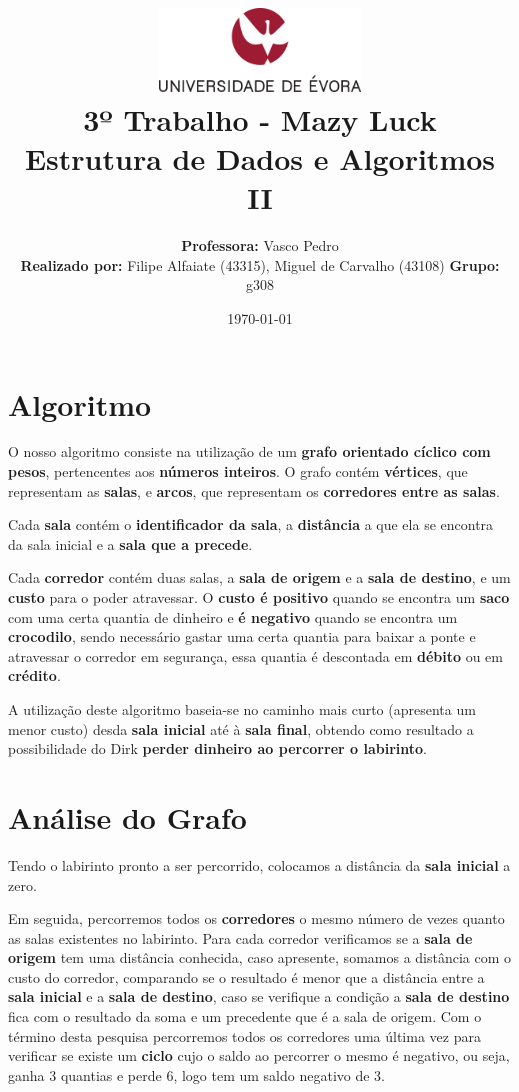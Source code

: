 \documentclass[11pt]{article}
\title
{
    \includegraphics[width=0.4\textwidth]{imgs/university.png}
    \\[0.1cm]
    \textbf{3º Trabalho - Mazy Luck} \\
    Estrutura de Dados e Algoritmos II
}
\author
{
    \textbf{Professora:} Vasco Pedro \\
    \textbf{Realizado por:} Filipe Alfaiate (43315), Miguel de Carvalho (43108)
    \textbf{Grupo:} g308
}
\date{\today}
\begin{document}
\maketitle

\section{Algoritmo}

\hspace{0,6cm}O nosso algoritmo consiste na utilização de um \textbf{grafo orientado cíclico
com pesos}, pertencentes aos \textbf{números inteiros}. O grafo contém \textbf{vértices}, que
representam as \textbf{salas}, e \textbf{arcos}, que representam os \textbf{corredores entre
as salas}.

Cada \textbf{sala} contém o \textbf{identificador da sala}, a \textbf{distância} a que ela se 
encontra da sala inicial e a \textbf{sala que a precede}. 

Cada \textbf{corredor} contém duas salas, a \textbf{sala de origem} e a \textbf{sala de destino},
e um \textbf{custo} para o poder atravessar. O \textbf{custo é positivo} quando se encontra um
\textbf{saco} com uma certa quantia de dinheiro e \textbf{é negativo} quando se encontra um
\textbf{crocodilo}, sendo necessário gastar uma certa quantia para baixar a ponte e atravessar o
corredor em segurança, essa quantia é descontada em \textbf{débito} ou em \textbf{crédito}.

A utilização deste algoritmo baseia-se no caminho mais curto (apresenta um menor custo) desda
\textbf{sala inicial} até à \textbf{sala final}, obtendo como resultado a possibilidade do
Dirk \textbf{perder dinheiro ao percorrer o labirinto}.

\section{Análise do Grafo}

\hspace{0,45cm} Tendo o labirinto pronto a ser percorrido, colocamos a distância da \textbf{sala 
inicial} a zero. 

Em seguida, percorremos todos os \textbf{corredores} o mesmo número de vezes quanto as salas existentes no
labirinto. Para cada corredor verificamos se a \textbf{sala de origem} tem uma distância conhecida,
caso apresente, somamos a distância com o custo do corredor, comparando se o resultado é menor que a
distância entre a \textbf{sala inicial} e a \textbf{sala de destino}, caso se verifique a condição
a \textbf{sala de destino} fica com o resultado da soma e um precedente que é a sala de origem.
Com o término desta pesquisa percorremos todos os corredores uma última vez para verificar se 
existe um \textbf{ciclo} cujo o saldo ao percorrer o mesmo é negativo, ou seja, ganha 3 quantias
e perde 6, logo tem um saldo negativo de 3.
\end{document}
